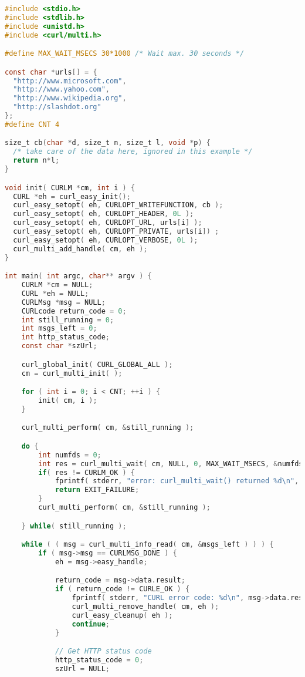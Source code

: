 \begin{lstlisting}[language=C]
#include <stdio.h>
#include <stdlib.h>
#include <unistd.h>
#include <curl/multi.h>

#define MAX_WAIT_MSECS 30*1000 /* Wait max. 30 seconds */

const char *urls[] = {
  "http://www.microsoft.com",
  "http://www.yahoo.com",
  "http://www.wikipedia.org",
  "http://slashdot.org"
};
#define CNT 4

size_t cb(char *d, size_t n, size_t l, void *p) {
  /* take care of the data here, ignored in this example */
  return n*l;
}

void init( CURLM *cm, int i ) {
  CURL *eh = curl_easy_init();
  curl_easy_setopt( eh, CURLOPT_WRITEFUNCTION, cb );
  curl_easy_setopt( eh, CURLOPT_HEADER, 0L );
  curl_easy_setopt( eh, CURLOPT_URL, urls[i] );
  curl_easy_setopt( eh, CURLOPT_PRIVATE, urls[i]) ;
  curl_easy_setopt( eh, CURLOPT_VERBOSE, 0L );
  curl_multi_add_handle( cm, eh );
}

int main( int argc, char** argv ) {
    CURLM *cm = NULL;
    CURL *eh = NULL;
    CURLMsg *msg = NULL;
    CURLcode return_code = 0;
    int still_running = 0; 
    int msgs_left = 0;
    int http_status_code;
    const char *szUrl;

    curl_global_init( CURL_GLOBAL_ALL );
    cm = curl_multi_init( );

    for ( int i = 0; i < CNT; ++i ) {
        init( cm, i );
    }

    curl_multi_perform( cm, &still_running );

    do {
        int numfds = 0;
        int res = curl_multi_wait( cm, NULL, 0, MAX_WAIT_MSECS, &numfds );
        if( res != CURLM_OK ) {
            fprintf( stderr, "error: curl_multi_wait() returned %d\n", res );
            return EXIT_FAILURE;
        }
        curl_multi_perform( cm, &still_running );

    } while( still_running );

    while ( ( msg = curl_multi_info_read( cm, &msgs_left ) ) ) {
        if ( msg->msg == CURLMSG_DONE ) {
            eh = msg->easy_handle;

            return_code = msg->data.result;
            if ( return_code != CURLE_OK ) {
                fprintf( stderr, "CURL error code: %d\n", msg->data.result );
                curl_multi_remove_handle( cm, eh );
                curl_easy_cleanup( eh );
                continue;
            }

            // Get HTTP status code
            http_status_code = 0;
            szUrl = NULL;


\end{lstlisting}
